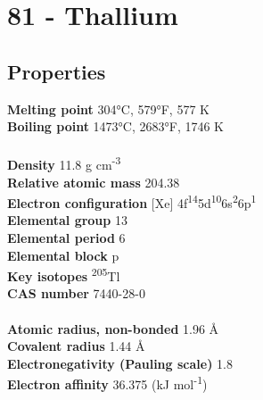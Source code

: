 \section{81 - Thallium}
\label{sec:elem-thallium}
\subsection{Properties}
\textbf{Melting point} 304°C, 579°F, 577 K\\
\textbf{Boiling point} 1473°C, 2683°F, 1746 K\\
\\
\textbf{Density} 11.8 g cm\textsuperscript{-3}\\
\textbf{Relative atomic mass} 204.38\\
\textbf{Electron configuration} [Xe] 4f\textsuperscript{14}5d\textsuperscript{10}6s\textsuperscript{2}6p\textsuperscript{1}\\
\textbf{Elemental group} 13\\
\textbf{Elemental period} 6\\
\textbf{Elemental block} p\\
\textbf{Key isotopes} \textsuperscript{205}Tl\\
\textbf{CAS number} 7440-28-0\\
\\
\textbf{Atomic radius, non-bonded} 1.96 Å\\
\textbf{Covalent radius} 1.44 Å\\
\textbf{Electronegativity (Pauling scale)} 1.8\\
\textbf{Electron affinity} 36.375 (kJ mol\textsuperscript{-1})\\